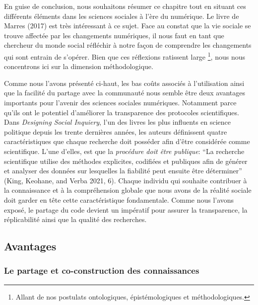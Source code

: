 \documentclass[
  letterpaper,
]{scrbook}
\begin{document}
En guise de conclusion, nous souhaitons résumer ce chapitre tout en
situant ces différents éléments dans les sciences sociales à l'ère du
numérique. Le livre de Marres (2017) est très intéressant à ce sujet.
Face au constat que la vie sociale se trouve affectée par les
changements numériques, il nous faut en tant que chercheur du monde
social réfléchir à notre façon de comprendre les changements qui sont
entrain de s'opérer. Bien que ces réflexions ratissent large
\footnote{Allant de nos postulats ontologiques, épistémologiques et
  méthodologiques.}, nous nous concentrons ici sur la dimension
méthodologique.

Comme nous l'avons présenté ci-haut, les bas coûts associés à
l'utilisation ainsi que la facilité du partage avec la communauté nous
semble être deux avantages importants pour l'avenir des sciences
sociales numériques. Notamment parce qu'ils ont le potentiel d'améliorer
la transparence des protocoles scientifiques. Dans \emph{Designing
Social Inquiery}, l'un des livres les plus influents en science
politique depuis les trente dernières années, les auteurs définissent
quatre caractéristiques que chaque recherche doit posséder afin d'être
considérée comme scientifique. L'une d'elles, est que la \emph{procédure
doit être publique}: ``La recherche scientifique utilise des méthodes
explicites, codifiées et publiques afin de générer et analyser des
données sur lesquelles la fiabilité peut ensuite être déterminer''
(King, Keohane, and Verba 2021, 6). Chaque individu qui souhaite
contribuer à la connaissance et à la compréhension globale que nous
avons de la réalité sociale doit garder en tête cette caractéristique
fondamentale. Comme nous l'avons exposé, le partage du code devient un
impératif pour assurer la transparence, la réplicabilité ainsi que la
qualité des recherches.

\hypertarget{avantages}{%
\subsection{Avantages}\label{avantages}}

\hypertarget{le-partage-et-co-construction-des-connaissances}{%
\subsubsection{Le partage et co-construction des
connaissances}\label{le-partage-et-co-construction-des-connaissances}}
\end{document}
